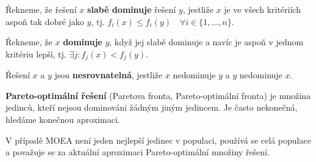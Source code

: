 Řekneme, že řešení $x$ \textbf{slabě dominuje} řešení $y$, jestliže $x$ je ve všech kritériích aspoň tak dobré jako $y$, tj. $f_i(x) \leq f_i(y)\quad \forall i \in \{1,\dots,n\}$. 

Řekneme, že $x$ \textbf{dominuje} $y$, když jej slabě dominuje a navíc je aspoň v jednom kritériu lepší, tj. $\exists j: f_j(x) < f_j(y)$. 

Řešení $x$ a $y$ jsou \textbf{nesrovnatelná}, jestliže $x$ nedominuje $y$ a $y$ nedominuje $x$.

\textbf{Pareto-optimální řešení} (Paretova fronta, Pareto-optimální fronta) je množina jedinců, kteří nejsou dominováni žádným jiným jedincem. Je často nekonečná, hledáme konečnou aproximaci.

V případě MOEA není jeden nejlepší jedinec v populaci, používá se celá populace a považuje se za aktuální aproximaci Pareto-optimální množiny řešení. 

